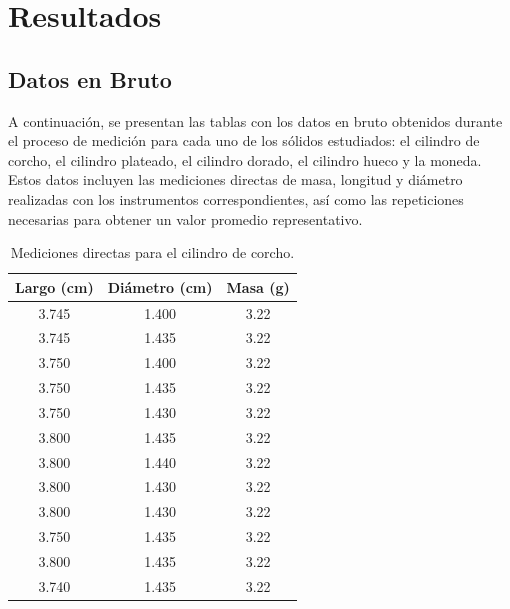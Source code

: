 

\chapter{Resultados}
\thispagestyle{fancy}
\label{ch:resultados}

\section{Datos en Bruto}

A continuación, se presentan las tablas con los datos en bruto obtenidos durante el proceso de medición para cada uno de los sólidos estudiados: el cilindro de corcho, el cilindro plateado, el cilindro dorado, el cilindro hueco y la moneda. Estos datos incluyen las mediciones directas de masa, longitud y diámetro realizadas con los instrumentos correspondientes, así como las repeticiones necesarias para obtener un valor promedio representativo.
\begin{table}[h!]
    \centering
    \caption{Mediciones directas para el cilindro de corcho.}
    \label{tab:corcho}
    \begin{tabular}{ccc}
    \toprule
    \textbf{Largo (cm)} & \textbf{Diámetro (cm)} & \textbf{Masa (g)} \\
    \midrule
    3.745 & 1.400 & 3.22 \\
    3.745 & 1.435 & 3.22 \\
    3.750 & 1.400 & 3.22 \\
    3.750 & 1.435 & 3.22 \\
    3.750 & 1.430 & 3.22 \\
    3.800 & 1.435 & 3.22 \\
    3.800 & 1.440 & 3.22 \\
    3.800 & 1.430 & 3.22 \\
    3.800 & 1.430 & 3.22 \\
    3.750 & 1.435 & 3.22 \\
    3.800 & 1.435 & 3.22 \\
    3.740 & 1.435 & 3.22 \\
    \bottomrule
    \end{tabular}
\end{table}

